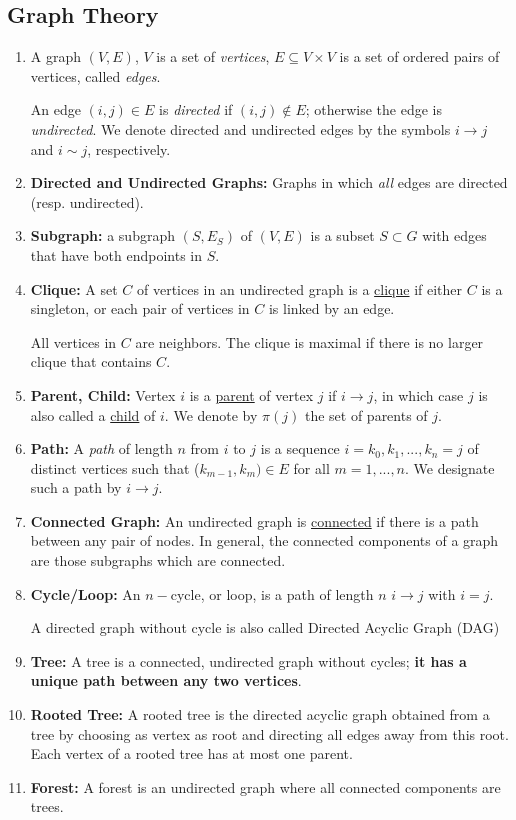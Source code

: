\documentclass[11pt,a4paper]{article}
\begin{document}
\subsection{Graph Theory}
\begin{enumerate}
    \item A graph $(V,E)$, $V$ is a set of \textit{vertices}, $E\subseteq V\times V$ is a set of ordered pairs of vertices, called \textit{edges}.
    
    An edge $(i,j)\in E$ is \textit{directed} if $(i,j)\notin E$; otherwise the edge is \textit{undirected}. We denote directed and undirected edges by the symbols $i \rightarrow j$ and $i\sim j$, respectively.
    \item \textbf{Directed and Undirected Graphs:} Graphs in which \textit{all} edges are directed (resp. undirected).
    \item \textbf{Subgraph:} a subgraph $(S,E_S)$ of $(V,E)$ is a subset $S\subset G$ with edges that have both endpoints in $S$.
    \item \textbf{Clique:} A set $C$ of vertices in an undirected graph is a \underline{clique} if either $C$ is a singleton, or each pair of vertices in $C$ is linked by an edge.
    
    All vertices in $C$ are neighbors. The clique is maximal if there is no larger clique that contains $C$.
    \item \textbf{Parent, Child:} Vertex $i$ is a \underline{parent} of vertex $j$ if $i \rightarrow j$, in which case $j$ is also called a \underline{child} of $i$. We denote by $\pi(j)$ the set of parents of $j$.
    \item \textbf{Path:} A \textit{path} of length $n$ from $i$ to $j$ is a sequence $i = k_0,k_1,...,k_n = j$ of distinct vertices such that ($k_{m-1},k_m) \in E$ for all $m = 1,... ,n$. We designate such a path by $i \rightarrow j$.
    \item \textbf{Connected Graph:} An undirected graph is \underline{connected} if there is a path between any pair of nodes. In general, the connected components of a graph are those subgraphs which are connected.
    \item \textbf{Cycle/Loop:} An $n-$cycle, or loop, is a path of length $n$ $i \rightarrow j$ with $i = j$.
    
    A directed graph without cycle is also called Directed Acyclic Graph (DAG)
    \item \textbf{Tree:} A tree is a connected, undirected graph without cycles; \textbf{it has a unique path between any two vertices}.
    \item \textbf{Rooted Tree:} A rooted tree is the directed acyclic graph obtained from a tree by choosing as vertex as root and directing all edges away from this root. Each vertex of a rooted tree has at most one parent.
    \item \textbf{Forest:} A forest is an undirected graph where all connected components are trees.
\end{enumerate}
\end{document}
